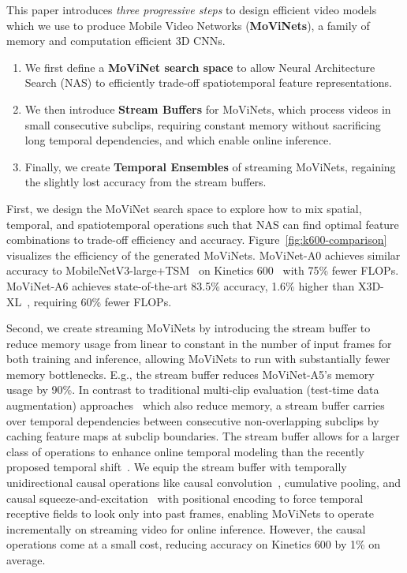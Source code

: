 \documentclass[final]{cvpr}
\newcommand{\ournet}{MoViNet\xspace} \newcommand{\ournets}{\ournet{}s\xspace}
\begin{document}
This paper introduces {\it three progressive steps} to design efficient video models which we use to produce Mobile Video Networks ({\bf \ournets}), a family of memory and computation efficient 3D CNNs.


\begin{enumerate}
    \item We first define a {\bf \ournet search space} to allow Neural Architecture Search (NAS) to efficiently trade-off spatiotemporal feature representations.
    \item We then introduce {\bf Stream Buffers} for \ournets, which process videos in small consecutive subclips, requiring constant memory without sacrificing long temporal dependencies, and which enable online inference.
    \item Finally, we create {\bf Temporal Ensembles} of streaming \ournets, regaining the slightly lost accuracy from the stream buffers.
\end{enumerate}

First, we design the \ournet search space to explore how to mix spatial, temporal, and spatiotemporal operations such that NAS can find optimal feature combinations to trade-off efficiency and accuracy.
Figure~\ref{fig:k600-comparison} visualizes the efficiency of the generated \ournets.
\ournet-A0 achieves similar accuracy to MobileNetV3-large+TSM~\cite{howard2019searching, lin2019tsm} on Kinetics 600~\cite{kay2017kinetics} with 75\% fewer FLOPs.
\ournet-A6 achieves state-of-the-art 83.5\% accuracy, 1.6\% higher than X3D-XL~\cite{feichtenhofer2020x3d}, requiring 60\% fewer FLOPs.

Second, we create streaming \ournets by introducing the stream buffer to reduce memory usage from linear to constant in the number of input frames for both training and inference, allowing \ournets to run with substantially fewer memory bottlenecks.
E.g., the stream buffer reduces \ournet-A5's memory usage by 90\%.
In contrast to traditional multi-clip evaluation (test-time data augmentation) approaches~\cite{simonyan2014two, wang2015towards} which also reduce memory, a stream buffer carries over temporal dependencies between consecutive non-overlapping subclips by caching feature maps at subclip boundaries.
The stream buffer allows for a larger class of operations to enhance online temporal modeling than the recently proposed temporal shift~\cite{lin2019tsm}.
We equip the stream buffer with temporally unidirectional causal operations like causal convolution~\cite{oord2016wavenet}, cumulative pooling, and causal squeeze-and-excitation~\cite{hu2018squeeze} with positional encoding to force temporal receptive fields to look only into past frames, enabling \ournets to operate incrementally on streaming video for online inference.
However, the causal operations come at a small cost, reducing accuracy on Kinetics 600 by 1\% on average.
\end{document}
